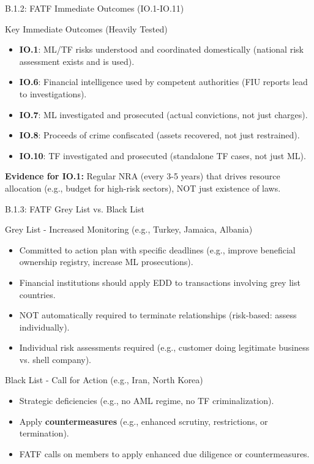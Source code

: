 \documentclass{beamer}
\begin{document}
	\begin{frame}{B.1.2: FATF Immediate Outcomes (IO.1-IO.11)}
		\begin{block}{Key Immediate Outcomes (Heavily Tested)}
			\begin{itemize}
				\item \textbf{IO.1}: ML/TF risks understood and coordinated domestically (national risk assessment exists and is used).
				\item \textbf{IO.6}: Financial intelligence used by competent authorities (FIU reports lead to investigations).
				\item \textbf{IO.7}: ML investigated and prosecuted (actual convictions, not just charges).
				\item \textbf{IO.8}: Proceeds of crime confiscated (assets recovered, not just restrained).
				\item \textbf{IO.10}: TF investigated and prosecuted (standalone TF cases, not just ML).
			\end{itemize}
		\end{block}
		\textbf{Evidence for IO.1:} Regular NRA (every 3-5 years) that drives resource allocation (e.g., budget for high-risk sectors), NOT just existence of laws.
	\end{frame}
	
	\begin{frame}{B.1.3: FATF Grey List vs. Black List}
		\begin{block}{Grey List - Increased Monitoring (e.g., Turkey, Jamaica, Albania)}
			\begin{itemize}
				\item Committed to action plan with specific deadlines (e.g., improve beneficial ownership registry, increase ML prosecutions).
				\item Financial institutions should apply EDD to transactions involving grey list countries.
				\item NOT automatically required to terminate relationships (risk-based: assess individually).
				\item Individual risk assessments required (e.g., customer doing legitimate business vs. shell company).
			\end{itemize}
		\end{block}
		\begin{block}{Black List - Call for Action (e.g., Iran, North Korea)}
			\begin{itemize}
				\item Strategic deficiencies (e.g., no AML regime, no TF criminalization).
				\item Apply \textbf{countermeasures} (e.g., enhanced scrutiny, restrictions, or termination).
				\item FATF calls on members to apply enhanced due diligence or countermeasures.
			\end{itemize}
		\end{block}
	\end{frame}
	
\end{document}
